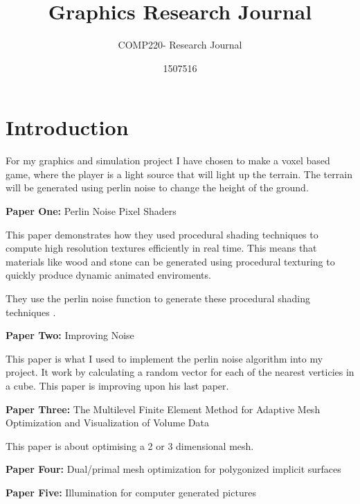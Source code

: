 \documentclass{scrartcl}
\title{Graphics Research Journal}
\subtitle{COMP220- Research Journal}
\author{1507516}
\begin{document}
\maketitle

\abstract{}

\section{Introduction}
For my graphics and simulation project I have chosen to make a voxel based game, where the player is a light source that will light up the terrain. The terrain will be generated using perlin noise to change the height of the ground.


\textbf{Paper One:}
Perlin Noise Pixel Shaders
\cite{hart2001perlin}
\par

This paper demonstrates how they used procedural shading techniques to compute high resolution textures efficiently in real time. This means that materials like wood and stone can be generated using procedural texturing to quickly produce dynamic animated enviroments.

They use the perlin noise function to generate these procedural shading techniques \cite{perlin2002improving}.

\par

\textbf{Paper Two:}
Improving Noise
\cite{perlin2002improving}
\par

This paper is what I used to implement the perlin noise algorithm into my project. It work by calculating a random vector for each of the nearest verticies in a cube.
This paper is improving upon his last paper.

\par 

\textbf{Paper Three:}
The Multilevel Finite Element Method for Adaptive Mesh
Optimization and Visualization of Volume Data
\cite{grosso1997multilevel}
\par

This paper is about optimising a 2 or 3 dimensional mesh. 

\textbf{Paper Four:}
Dual/primal mesh optimization for polygonized implicit surfaces
\cite{ohtake2002dual}
\par

\textbf{Paper Five:}
Illumination for computer generated pictures
\cite{phong1975illumination}
\par
\end{document}

